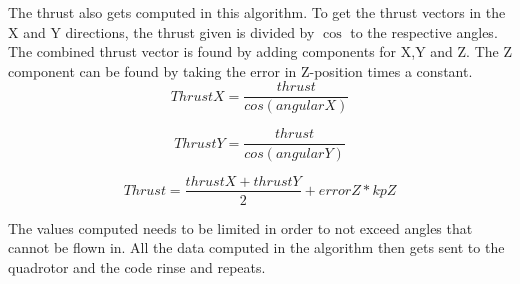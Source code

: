 The thrust also gets computed in this algorithm. To get the thrust vectors in the X and Y directions, the thrust given is divided by $\cos$ to the respective angles. The combined thrust vector is found by adding components for X,Y and Z. The Z component can be found by taking the error in Z-position times a constant.  
\begin{equation}
        ThrustX = \frac{thrust}{cos(angularX)}
\end{equation}

\begin{equation}
        ThrustY = \frac{thrust}{cos(angularY)}
\end{equation}

\begin{equation}
        Thrust = \frac{thrustX + thrustY}{2}  + errorZ*kpZ
\end{equation}

The values computed needs to be limited in order to not exceed angles that cannot be flown in.
All the data computed in the algorithm then gets sent to the quadrotor and the code rinse and repeats.



